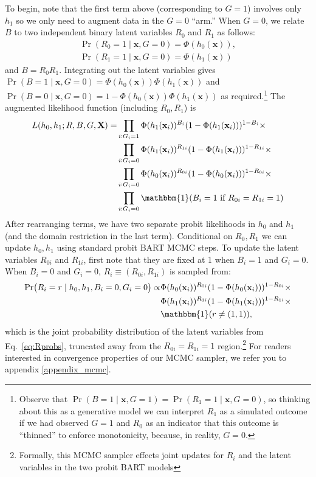 \documentclass[aoas,preprint, 11pt, dvipsnames, table, x11name]{imsart}
\newcommand{\ind}[1]{\mathbbm{1}({#1})}%
\theoremstyle{remark}
\begin{document}
	To begin, note that the first term above (corresponding to $G=1$) involves only $h_1$ so we only need to augment data in the $G=0$ ``arm.'' When $G=0$, we relate $B$ to two independent binary latent variables $R_0$ and $R_1$  as follows:
	\begin{gather*}
		\Pr(R_0=1\mid\mathbf{x}, G=0) = \Phi(h_0(\mathbf{x})),\\
		\Pr(R_1=1\mid\mathbf{x}, G=0) = \Phi(h_1(\mathbf{x}))\label{eq:Rprobs}
	\end{gather*}
	and $B = R_0R_1$. Integrating out the latent variables gives $\Pr(B=1\mid\mathbf{x}, G=0) = \Phi(h_0(\mathbf{x}))\Phi(h_1(\mathbf{x}))$ and $\Pr(B=0\mid\mathbf{x}, G=0) = 1-\Phi(h_0(\mathbf{x}))\Phi(h_1(\mathbf{x}))$ as required.\footnote{Observe that $\Pr(B=1\mid\mathbf{x}, G=1) = \Pr(R_1=1\mid\mathbf{x}, G=0)$, so thinking about this as a generative model we can interpret $R_1$ as a simulated outcome if we had observed $G=1$ and $R_0$ as an indicator that this outcome is ``thinned'' to enforce monotonicity, because, in reality, $G=0$.} 
	The augmented likelihood function (including $R_0, R_1$) is 
	\begin{equation}
		\begin{split}
			L(h_0, h_1; R, B, G, \mathbf{X}) =&\prod_{i: G_i=1}\Phi(h_1(\mathbf{x}_i))^{B_i}(1-\Phi(h_1(\mathbf{x}_i)))^{1-B_i} \times \\
			&\prod_{i: G_i=0} \Phi(h_1(\mathbf{x}_i))^{R_{1i}}(1-\Phi(h_1(\mathbf{x}_i)))^{1-R_{1i}}\times \\
			&\prod_{i: G_i=0}\Phi(h_0(\mathbf{x}_i))^{R_{0i}}(1-\Phi(h_0(\mathbf{x}_i)))^{1-R_{0i}}\times\\
			&\prod_{i: G_i=0}\ind{B_i = 1\text{ if }R_{0i}=R_{1i}=1} 
			\label{eq:bart-da1}
		\end{split}
	\end{equation}
	After rearranging terms, we have two separate probit likelihoods in $h_0$ and $h_1$ (and the domain restriction in the last term). Conditional on $R_0, R_1$ we can update $h_0, h_1$ using standard probit BART MCMC steps. To update the latent variables $R_{0i}$ and $R_{1i}$, first note that they are fixed at 1 when $B_i=1$ and $G_i=0$. When $B_i=0$ and $G_i=0$, $R_i\equiv (R_{0i}, R_{1i})$ is sampled from:
	\begin{equation}
		\begin{split}
			\Pr(R_i=r\mid h_0, h_1, B_i=0, G_i=0)\propto
			&\Phi(h_0(\mathbf{x}_i))^{R_{0i}}(1-\Phi(h_0(\mathbf{x}_i)))^{1-R_{0i}}\times\\
			&\Phi(h_1(\mathbf{x}_i))^{R_{1i}}(1-\Phi(h_1(\mathbf{x}_i)))^{1-R_{1i}}\times \\
			&\ind{r\neq (1,1)},
		\end{split}
	\end{equation}
	which is the joint probability distribution of the latent variables from Eq.~\eqref{eq:Rprobs}, truncated away from the $R_{0i} = R_{1i}=1$  region.\footnote{Formally, this MCMC sampler effects joint updates for $R_i$ and the latent variables in the two probit BART models} For readers interested in convergence properties of our MCMC sampler, we refer you to appendix \autoref{appendix_mcmc}.
\end{document}
